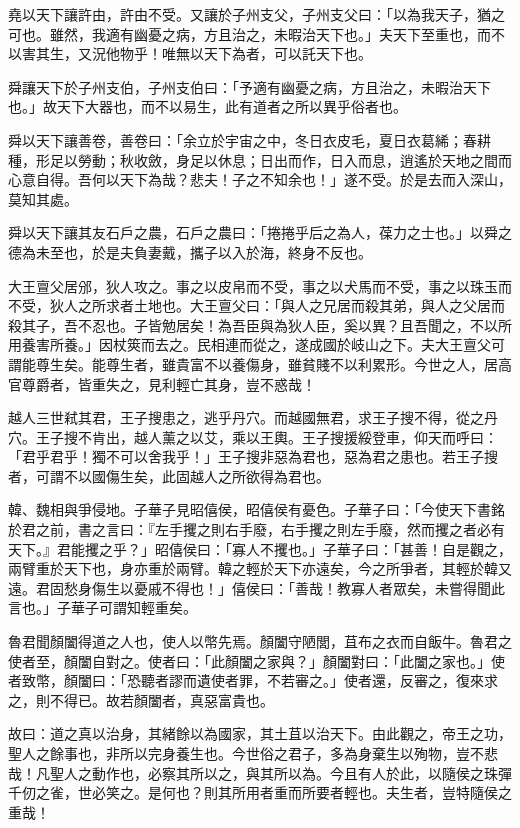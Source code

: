 
\begin{pinyinscope}
堯以天下讓許由，許由不受。又讓於子州支父，子州支父曰：「以為我天子，猶之可也。雖然，我適有幽憂之病，方且治之，未暇治天下也。」夫天下至重也，而不以害其生，又況他物乎！唯無以天下為者，可以託天下也。

舜讓天下於子州支伯，子州支伯曰：「予適有幽憂之病，方且治之，未暇治天下也。」故天下大器也，而不以易生，此有道者之所以異乎俗者也。

舜以天下讓善卷，善卷曰：「余立於宇宙之中，冬日衣皮毛，夏日衣葛絺；春耕種，形足以勞動；秋收斂，身足以休息；日出而作，日入而息，逍遙於天地之間而心意自得。吾何以天下為哉？悲夫！子之不知余也！」遂不受。於是去而入深山，莫知其處。

舜以天下讓其友石戶之農，石戶之農曰：「捲捲乎后之為人，葆力之士也。」以舜之德為未至也，於是夫負妻戴，攜子以入於海，終身不反也。

大王亶父居邠，狄人攻之。事之以皮帛而不受，事之以犬馬而不受，事之以珠玉而不受，狄人之所求者土地也。大王亶父曰：「與人之兄居而殺其弟，與人之父居而殺其子，吾不忍也。子皆勉居矣！為吾臣與為狄人臣，奚以異？且吾聞之，不以所用養害所養。」因杖筴而去之。民相連而從之，遂成國於岐山之下。夫大王亶父可謂能尊生矣。能尊生者，雖貴富不以養傷身，雖貧賤不以利累形。今世之人，居高官尊爵者，皆重失之，見利輕亡其身，豈不惑哉！

越人三世弒其君，王子搜患之，逃乎丹穴。而越國無君，求王子搜不得，從之丹穴。王子搜不肯出，越人薰之以艾，乘以王輿。王子搜援綏登車，仰天而呼曰：「君乎君乎！獨不可以舍我乎！」王子搜非惡為君也，惡為君之患也。若王子搜者，可謂不以國傷生矣，此固越人之所欲得為君也。

韓、魏相與爭侵地。子華子見昭僖侯，昭僖侯有憂色。子華子曰：「今使天下書銘於君之前，書之言曰：『左手攫之則右手廢，右手攫之則左手廢，然而攫之者必有天下。』君能攫之乎？」昭僖侯曰：「寡人不攫也。」子華子曰：「甚善！自是觀之，兩臂重於天下也，身亦重於兩臂。韓之輕於天下亦遠矣，今之所爭者，其輕於韓又遠。君固愁身傷生以憂戚不得也！」僖侯曰：「善哉！教寡人者眾矣，未嘗得聞此言也。」子華子可謂知輕重矣。

魯君聞顏闔得道之人也，使人以幣先焉。顏闔守陋閭，苴布之衣而自飯牛。魯君之使者至，顏闔自對之。使者曰：「此顏闔之家與？」顏闔對曰：「此闔之家也。」使者致幣，顏闔曰：「恐聽者謬而遺使者罪，不若審之。」使者還，反審之，復來求之，則不得已。故若顏闔者，真惡富貴也。

故曰：道之真以治身，其緒餘以為國家，其土苴以治天下。由此觀之，帝王之功，聖人之餘事也，非所以完身養生也。今世俗之君子，多為身棄生以殉物，豈不悲哉！凡聖人之動作也，必察其所以之，與其所以為。今且有人於此，以隨侯之珠彈千仞之雀，世必笑之。是何也？則其所用者重而所要者輕也。夫生者，豈特隨侯之重哉！


\end{pinyinscope}
